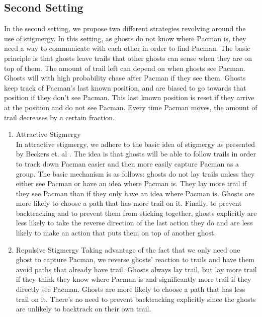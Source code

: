 \documentclass[11pt]{article}
\begin{document}
\begin{multicols}{2}
\subsection{Second Setting}
In the second setting, we propose two different strategies revolving around the use of stigmergy.  In this setting, as ghosts do not know where Pacman is, they need a way to communicate with each other in order to find Pacman. The basic principle is that ghosts leave trails that other ghosts can sense when they are on top of them. The amount of trail left can depend on when ghosts see Pacman.  Ghosts will with high probability chase after Pacman if they see them.  Ghosts keep track of Pacman's last known position, and are biased to go towards that position if they don't see Pacman.  This last known position is reset if they arrive at the position and do not see Pacman.  Every time Pacman moves, the amount of trail decreases by a certain fraction.

\begin{enumerate}[leftmargin=0.25cm]
	\item Attractive Stigmergy\\
 	In attractive stigmergy, we adhere to the basic idea of stigmergy as presented by Beckers et. al \cite{beckers1992trails}. The idea is that ghosts will be able to follow trails in order to track down Pacman easier and then more easily capture Pacman as a group.  The basic mechanism is as follows: ghosts do not lay trails unless they either see Pacman or have an idea where Pacman is.  They lay more trail if they see Pacman than if they only have an idea where Pacman is.  Ghosts are more likely to choose a path that has more trail on it.  Finally, to prevent backtracking and to prevent them from sticking together, ghosts explicitly are less likely to take the reverse direction of the last action they do and are less likely to make an action that puts them on top of another ghost.
	
	\item Repulsive Stigmergy
	Taking advantage of the fact that we only need one ghost to capture Pacman, we reverse ghosts' reaction to trails and have them avoid paths that already have trail.  Ghosts always lay trail, but lay more trail if they think they know where Pacman is and significantly more trail if they directly see Pacman. Ghosts are more likely to choose a path that has less trail on it.  There's no need to prevent backtracking explicitly since the ghosts are unlikely to backtrack on their own trail.
\end{enumerate}



\end{multicols}
\end{document}
